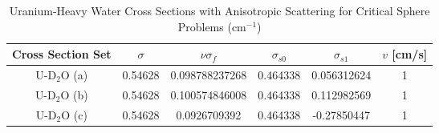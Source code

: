\begin{table}[!htbp]
	\caption{Uranium-Heavy Water Cross Sections with Anisotropic Scattering for Critical Sphere Problems (cm$^{-1}$) \cite{sood2003analytical}}
	\label{table:SoodUD2OAniso}
	\centering{}
    \begin{tabular}{*6c}
        \toprule
	Cross Section Set & $\sigma$ & $\nu \sigma_{f}$ & $\sigma_{s0}$  & $\sigma_{s1}$ & $v$ [cm/s] \\ 
        \midrule
	U-D$_{2}$O (a)  & 0.54628 & 0.098788237268 & 0.464338 & 0.056312624 & 1 \\
	U-D$_{2}$O (b)  & 0.54628 & 0.100574846008 & 0.464338 & 0.112982569 & 1 \\
	U-D$_{2}$O (c)  & 0.54628 & 0.0926709392 & 0.464338 & -0.27850447 & 1 \\
        \bottomrule
    \end{tabular}
\end{table}

